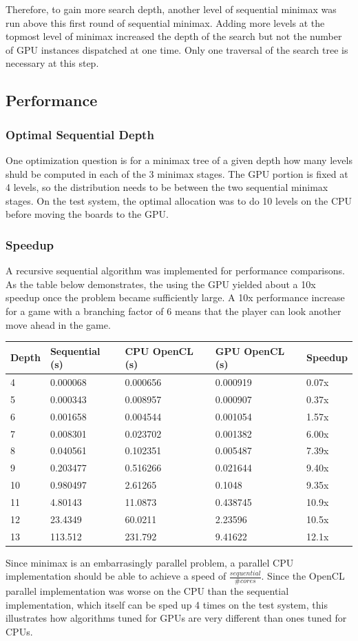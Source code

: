 \documentclass{article}
\begin{document}
Therefore, to gain more search depth, another level of sequential minimax was run above this first round of sequential minimax. Adding more levels at the topmost level of minimax increased the depth of the search but not the number of GPU instances dispatched at one time. Only one traversal of the search tree is necessary at this step.

\subsection{Performance}
\subsubsection{Optimal Sequential Depth}
One optimization question is for a minimax tree of a given depth how many levels shuld be computed in each of the 3 minimax stages. The GPU portion is fixed at 4 levels, so the distribution needs to be between the two sequential minimax stages. On the test system, the optimal allocation was to do 10 levels on the CPU before moving the boards to the GPU.

\subsubsection{Speedup}
A recursive sequential algorithm was implemented for performance comparisons. As the table below demonstrates, the using the GPU yielded about a 10x speedup once the problem became sufficiently large. A 10x performance increase for a game with a branching factor of 6 means that the player can look another move ahead in the game.

\begin{tabular}{| l | l | l | l | l |}
  \hline
  Depth & Sequential (s) & CPU OpenCL (s) & GPU OpenCL (s) & Speedup\\
  \hline
  4 & 0.000068 & 0.000656 & 0.000919 & 0.07x \\
  5 & 0.000343 & 0.008957 & 0.000907 & 0.37x \\
  6 & 0.001658 & 0.004544 & 0.001054 & 1.57x \\
  7 & 0.008301 & 0.023702 & 0.001382 & 6.00x \\
  8 & 0.040561 & 0.102351 & 0.005487 & 7.39x \\
  9 & 0.203477 & 0.516266 & 0.021644 & 9.40x \\
  10 & 0.980497 & 2.61265 & 0.1048 & 9.35x \\
  11 & 4.80143 & 11.0873 & 0.438745 & 10.9x \\
  12 & 23.4349 & 60.0211 & 2.23596 & 10.5x \\
  13 & 113.512 & 231.792 & 9.41622 & 12.1x \\
  \hline
\end{tabular}
Since minimax is an embarrasingly parallel problem, a parallel CPU implementation should be able to achieve a speed of $\frac{sequential}{\# cores}$. Since the OpenCL parallel implementation was worse on the CPU than the sequential implementation, which itself can be sped up 4 times on the test system, this illustrates how algorithms tuned for GPUs are very different than ones tuned for CPUs.
\end{document}
